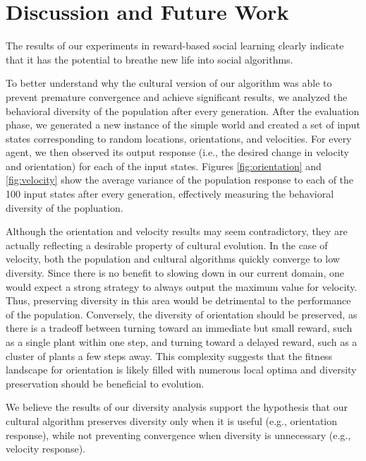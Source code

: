 \documentclass{acm_proc_article-sp}
\begin{document}
\section{Discussion and Future Work}
\label{sec:future}
The results of our experiments in reward-based social learning clearly indicate that it has the potential to breathe new life into social algorithms.

To better understand why the cultural version of our algorithm was able to prevent premature convergence and achieve significant results, we analyzed the behavioral diversity of the population after every generation. After the evaluation phase, we generated a new instance of the simple world and created a set of input states corresponding to random locations, orientations, and velocities. For every agent, we then observed its output response (i.e., the desired change in velocity and orientation) for each of the input states. Figures \ref{fig:orientation} and \ref{fig:velocity} show the average variance of the population response to each of the 100 input states after every generation, effectively measuring the behavioral diversity of the popluation.

Although the orientation and velocity results may seem contradictory, they are actually reflecting a desirable property of cultural evolution. In the case of velocity, both the population and cultural algorithms quickly converge to low diversity. Since there is no benefit to slowing down in our current domain, one would expect a strong strategy to always output the maximum value for velocity. Thus, preserving diversity in this area would be detrimental to the performance of the population. Conversely, the diversity of orientation should be preserved, as there is a tradeoff between turning toward an immediate but small reward, such as a single plant within one step, and turning toward a delayed reward, such as a cluster of plants a few steps away. This complexity suggests that the fitness landscape for orientation  is likely filled with numerous local optima and diversity preservation should be beneficial to evolution. 

We believe the results of our diversity analysis support the hypothesis that our cultural algorithm preserves diversity only when it is useful (e.g., orientation response), while not preventing convergence when diversity is unnecessary (e.g., velocity response).
\end{document}
